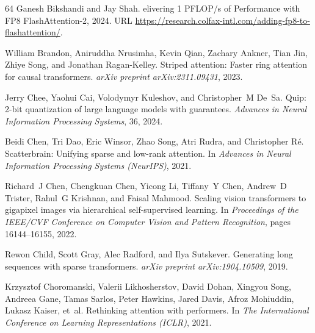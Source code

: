 \documentclass{article}
\begin{document}
\begin{thebibliography}{64}
Ganesh Bikshandi and Jay Shah.
elivering 1 {PFLOP}/s of {P}erformance with {FP8}
  {F}lash{A}ttention-2, 2024.
\newblock URL
  \url{https://research.colfax-intl.com/adding-fp8-to-flashattention/}.

William Brandon, Aniruddha Nrusimha, Kevin Qian, Zachary Ankner, Tian Jin,
  Zhiye Song, and Jonathan Ragan-Kelley.
\newblock Striped attention: Faster ring attention for causal transformers.
\newblock \emph{arXiv preprint arXiv:2311.09431}, 2023.

Jerry Chee, Yaohui Cai, Volodymyr Kuleshov, and Christopher~M De~Sa.
\newblock Quip: 2-bit quantization of large language models with guarantees.
\newblock \emph{Advances in Neural Information Processing Systems}, 36, 2024.

Beidi Chen, Tri Dao, Eric Winsor, Zhao Song, Atri Rudra, and Christopher Ré.
\newblock Scatterbrain: Unifying sparse and low-rank attention.
\newblock In \emph{Advances in Neural Information Processing Systems
  (NeurIPS)}, 2021.

Richard~J Chen, Chengkuan Chen, Yicong Li, Tiffany~Y Chen, Andrew~D Trister,
  Rahul~G Krishnan, and Faisal Mahmood.
\newblock Scaling vision transformers to gigapixel images via hierarchical
  self-supervised learning.
\newblock In \emph{Proceedings of the IEEE/CVF Conference on Computer Vision
  and Pattern Recognition}, pages 16144--16155, 2022.

Rewon Child, Scott Gray, Alec Radford, and Ilya Sutskever.
\newblock Generating long sequences with sparse transformers.
\newblock \emph{arXiv preprint arXiv:1904.10509}, 2019.

Krzysztof Choromanski, Valerii Likhosherstov, David Dohan, Xingyou Song,
  Andreea Gane, Tamas Sarlos, Peter Hawkins, Jared Davis, Afroz Mohiuddin,
  Lukasz Kaiser, et~al.
\newblock Rethinking attention with performers.
\newblock In \emph{The International Conference on Learning Representations
  ({ICLR})}, 2021.


\end{thebibliography}
\end{document}
